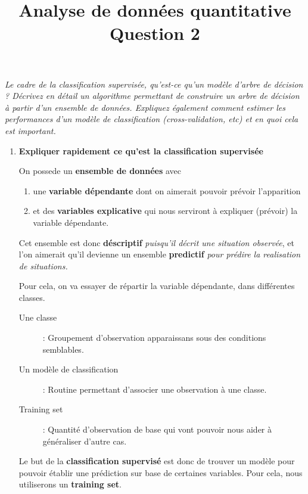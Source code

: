 \documentclass[a4paper, 11pt, onecolumn]{article}
\title{Analyse de données quantitative\\Question 2}
\date{}
\begin{document}
\maketitle

\textit{Le cadre de la classification supervisée, qu’est-ce qu’un modèle d’arbre de décision ? Décrivez en détail un algorithme permettant de construire un arbre de décision à partir d’un ensemble de données. Expliquez également comment estimer les performances d’un modèle de classification (cross-validation, etc) et en quoi cela est important.}

\begin{enumerate}

  \item \textbf{Expliquer rapidement ce qu'est la classification supervisée} 

  On possede un \textbf{ensemble de données} avec 
  
  \begin{enumerate}
    \item {une \textbf{variable dépendante} dont on aimerait pouvoir prévoir l'apparition}
    \item {et des \textbf{variables explicative} qui nous serviront à expliquer (prévoir) la variable dépendante.}
  \end{enumerate}
  
  Cet ensemble est donc \textbf{déscriptif} \textit{puisqu'il décrit une situation observée}, et l'on aimerait qu'il devienne un ensemble\textbf{ predictif} \textit{pour prédire la realisation de situations.}

Pour cela, on va essayer de répartir la variable dépendante, dans différentes classes.

\begin{framed}
  \begin{description}
    \item[Une classe] : Groupement d'observation apparaissans sous des
      conditions semblables.
    \item[Un modèle de classification ] : Routine permettant d'associer une observation
      à une classe.
    \item[Training set ] : Quantité d'observation de base qui vont pouvoir nous aider à 
      généraliser d'autre cas.
    \end{description}
  \end{framed}

  Le but de la \textbf{classification supervisé} est donc de trouver un modèle
  pour pouvoir établir une prédiction sur base de certaines variables. 
  Pour cela, nous utiliserons un \textbf{training set}.


\end{enumerate}
\end{document}
